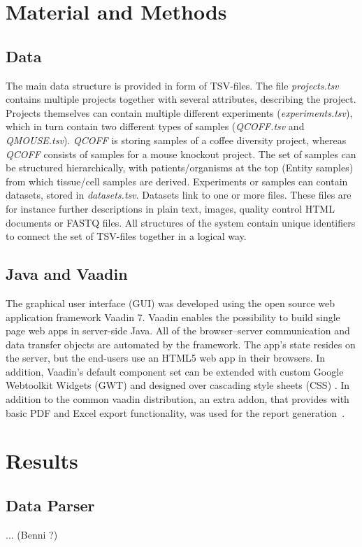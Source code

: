 \documentclass[a4paper, 11pt]{article}
\begin{document}
\section{Material and Methods}
\subsection{Data}
The main data structure is provided in form of TSV-files. The file \emph{projects.tsv} contains multiple projects together with several attributes, describing the project. Projects themselves can contain multiple different experiments (\emph{experiments.tsv}), which in turn contain two different types of samples (\emph{QCOFF.tsv} and \emph{QMOUSE.tsv}). \emph{QCOFF} is storing samples of a coffee diversity project, whereas \emph{QCOFF} consists of samples for a mouse knockout project. The set of samples can be structured hierarchically, with patients/organisms at the top (Entity samples) from which tissue/cell samples are derived. Experiments or samples can contain datasets, stored in \emph{datasets.tsv}. Datasets link to one or more files. These files are for instance further descriptions in plain text, images, quality control HTML documents or FASTQ files. All structures of the system contain unique identifiers to connect the set of TSV-files together in a logical way.
\subsection{Java and Vaadin}
The graphical user interface (GUI) was developed using the open source web application framework Vaadin 7. Vaadin enables the possibility to build single page web apps in server-side Java. All of the browser–server communication and data transfer objects are automated by the framework. The app's state resides on the server, but the end-users use an HTML5 web app in their browsers. In addition, Vaadin's default component set can be extended with custom Google Webtoolkit Widgets (GWT) and designed over cascading style sheets (CSS) \cite{Vaadin}. In addition to the common vaadin distribution, an extra addon, that provides with basic PDF and Excel export functionality, was used for the report generation~\cite{addon}.  
\section{Results}
\subsection{Data Parser}
... (Benni ?)
\end{document}
